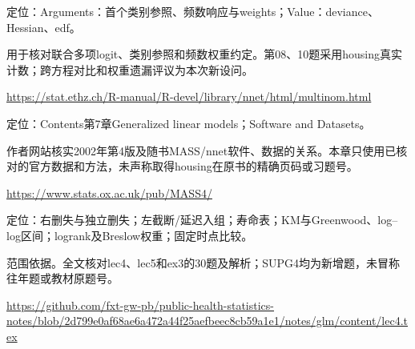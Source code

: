 \par\noindent\begin{minipage}{\linewidth}\raggedright{}\label{src:G3-MULTINOM}
\par
定位：Arguments：首个类别参照、频数响应与weights；Value：deviance、Hessian、edf。\par
用于核对联合多项logit、类别参照和频数权重约定。第08、10题采用housing真实计数；跨方程对比和权重遗漏评议为本次新设问。\par
{\small \url{https://stat.ethz.ch/R-manual/R-devel/library/nnet/html/multinom.html}}\par
\end{minipage}\par\medskip

\par\noindent\begin{minipage}{\linewidth}\raggedright{}\label{src:G3-MASS4}
\par
定位：Contents第7章Generalized linear models；Software and Datasets。\par
作者网站核实2002年第4版及随书MASS/nnet软件、数据的关系。本章只使用已核对的官方数据和方法，未声称取得housing在原书的精确页码或习题号。\par
{\small \url{https://www.stats.ox.ac.uk/pub/MASS4/}}\par
\end{minipage}\par\medskip

\par\noindent\begin{minipage}{\linewidth}\raggedright{}\label{src:G4-NOTE}
\par
定位：右删失与独立删失；左截断/延迟入组；寿命表；KM与Greenwood、log–log区间；logrank及Breslow权重；固定时点比较。\par
范围依据。全文核对lec4、lec5和ex3的30题及解析；SUPG4均为新增题，未冒称往年题或教材原题号。\par
{\small \url{https://github.com/fxt-gw-pb/public-health-statistics-notes/blob/2d799e0af68ae6a472a44f25aefbeec8cb59a1e1/notes/glm/content/lec4.tex}}\par
\end{minipage}\par\medskip

